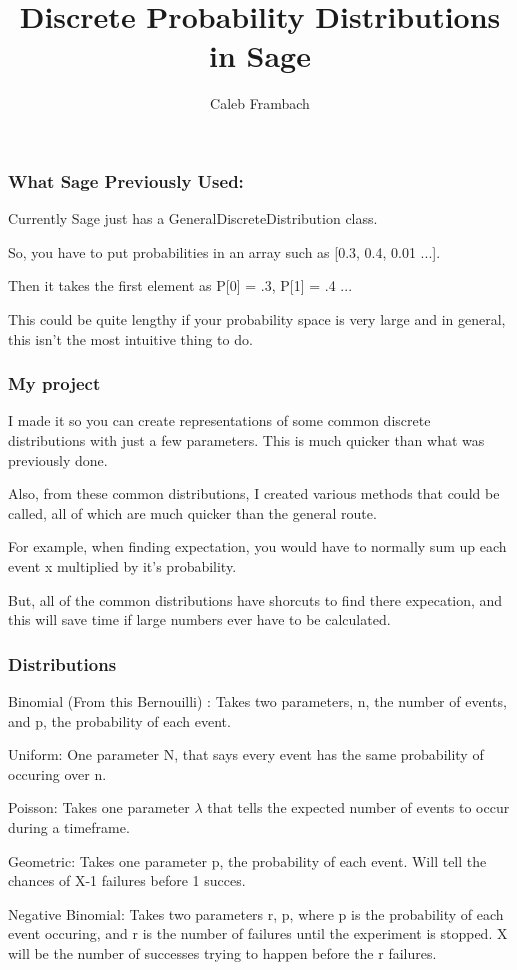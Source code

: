 \documentclass{beamer}
\title{Discrete Probability Distributions in Sage}
\author{Caleb Frambach}\institute{University of Washington}
\begin{document}
\begin{frame}
\titlepage

\end{frame}

\begin{frame}
\frametitle{What Sage Previously Used:}
Currently Sage just has a GeneralDiscreteDistribution class.

So, you have to put probabilities in an array such as [0.3, 0.4, 0.01 ...].

Then it takes the first element as P[0] = .3, P[1] = .4 ...

This could be quite lengthy if your probability space is very large and in general, this isn't the most intuitive thing to do.
\end{frame}

\begin{frame}
\frametitle{My project}
I made it so you can create representations of some common discrete distributions with just a few parameters. 
This is much quicker than what was previously done.

Also, from these common distributions, I created various methods that could be called, all of which are much quicker than the general route.

For example, when finding expectation, you would have to normally sum up each event x multiplied by it's probability.

But, all of the common distributions have shorcuts to find there expecation, and this will save time if large numbers ever have to be calculated.
\end{frame}

\begin{frame}
\frametitle{Distributions}
Binomial (From this Bernouilli) : Takes two parameters, n, the number of events, and p, the probability of each event.

Uniform: One parameter N, that says every event has the same probability of occuring over n.

Poisson: Takes one parameter $\lambda$ that tells the expected number of events to occur during a timeframe.

Geometric: Takes one parameter p, the probability of each event. Will tell the chances of X-1 failures before 1 succes.

Negative Binomial: Takes two parameters r, p, where p is the probability of each event occuring, and r is the number of failures until the experiment is stopped. X will be the number of successes trying to happen before the r failures.


\end{frame}
\end{document}
